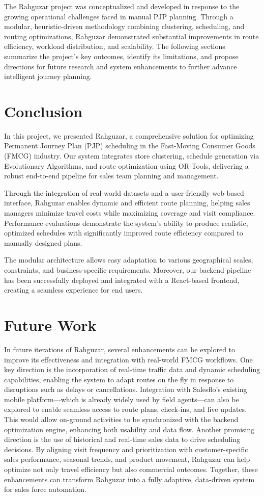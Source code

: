 The Rahguzar project was conceptualized and developed in response to the growing operational challenges faced in manual PJP planning. Through a modular, heuristic-driven methodology combining clustering, scheduling, and routing optimizations, Rahguzar demonstrated substantial improvements in route efficiency, workload distribution, and scalability. The following sections summarize the project’s key outcomes, identify its limitations, and propose directions for future research and system enhancements to further advance intelligent journey planning.

\section{Conclusion}
In this project, we presented Rahguzar, a comprehensive solution for optimizing Permanent Journey Plan (PJP) scheduling in the Fast-Moving Consumer Goods (FMCG) industry. Our system integrates store clustering, schedule generation via Evolutionary Algorithms, and route optimization using OR-Tools, delivering a robust end-to-end pipeline for sales team planning and management.

Through the integration of real-world datasets and a user-friendly web-based interface, Rahguzar enables dynamic and efficient route planning, helping sales managers minimize travel costs while maximizing coverage and visit compliance. Performance evaluations demonstrate the system’s ability to produce realistic, optimized schedules with significantly improved route efficiency compared to manually designed plans.

The modular architecture allows easy adaptation to various geographical scales, constraints, and business-specific requirements. Moreover, our backend pipeline has been successfully deployed and integrated with a React-based frontend, creating a seamless experience for end users.
\section{Future Work}
In future iterations of Rahguzar, several enhancements can be explored to improve its effectiveness and integration with real-world FMCG workflows. One key direction is the incorporation of real-time traffic data and dynamic scheduling capabilities, enabling the system to adapt routes on the fly in response to disruptions such as delays or cancellations. Integration with Salesflo’s existing mobile platform—which is already widely used by field agents—can also be explored to enable seamless access to route plans, check-ins, and live updates. This would allow on-ground activities to be synchronized with the backend optimization engine, enhancing both usability and data flow. Another promising direction is the use of historical and real-time sales data to drive scheduling decisions. By aligning visit frequency and prioritization with customer-specific sales performance, seasonal trends, and product movement, Rahguzar can help optimize not only travel efficiency but also commercial outcomes. Together, these enhancements can transform Rahguzar into a fully adaptive, data-driven system for sales force automation.